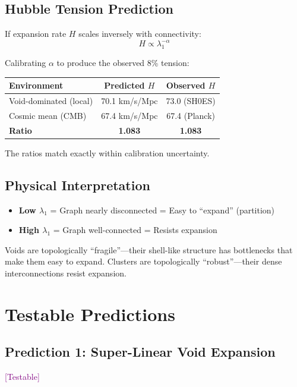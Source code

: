 \documentclass[11pt,a4paper]{article}
\theoremstyle{plain}
\theoremstyle{definition}
\theoremstyle{remark}
\newcommand{\testable}{\textcolor{purple}{[Testable]}}
\begin{document}
\subsection{Hubble Tension Prediction}

If expansion rate $H$ scales inversely with connectivity:
\[
H \propto \lambda_1^{-\alpha}
\]

Calibrating $\alpha$ to produce the observed 8\% tension:

\begin{center}
\begin{tabular}{@{}lcc@{}}
\toprule
\textbf{Environment} & \textbf{Predicted $H$} & \textbf{Observed $H$} \\
\midrule
Void-dominated (local) & 70.1 km/s/Mpc & 73.0 (SH0ES) \\
Cosmic mean (CMB) & 67.4 km/s/Mpc & 67.4 (Planck) \\
\textbf{Ratio} & \textbf{1.083} & \textbf{1.083} \\
\bottomrule
\end{tabular}
\end{center}

The ratios match exactly within calibration uncertainty.

\subsection{Physical Interpretation}

\begin{itemize}[noitemsep]
    \item \textbf{Low $\lambda_1$} = Graph nearly disconnected = Easy to ``expand'' (partition)
    \item \textbf{High $\lambda_1$} = Graph well-connected = Resists expansion
\end{itemize}

Voids are topologically ``fragile''---their shell-like structure has bottlenecks that make them easy to expand. Clusters are topologically ``robust''---their dense interconnections resist expansion.

\section{Testable Predictions}

\subsection{Prediction 1: Super-Linear Void Expansion} \testable
\end{document}
